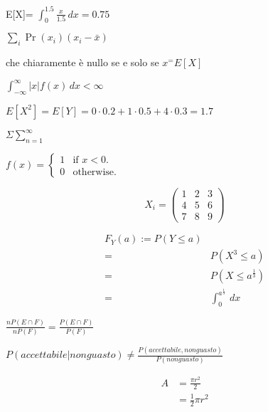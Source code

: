 \documentclass[]{article}
\begin{document}
    E[X]= $\int_{0}^{1.5} \frac{x}{1.5}\,dx = 0.75$
    
    $\sum_{i}^{} \Pr(x_i)(x_i - \bar{x}) $

    che chiaramente è nullo se e solo se $x^ = E[X]$

    $\int_ {-\infty }^{\infty} |x| f(x) \,dx < \infty$

    $E[X^2] = E[Y] = 0 \cdot 0.2 + 1 \cdot 0.5 + 4 \cdot 0.3 = 1.7$

    $\Sigma \sum_{n = 1}^{\infty} $
    
    \begin{math}
        f(x)=\left\{
            \begin{array}{ll}
                1 & \mbox{if $x<0$}.\\
                0 & \mbox{otherwise}.
            \end{array}
        \right.
    \end{math}

    $$
    X_i =
    \begin{pmatrix} 
        1 & 2 & 3 \\
        4 & 5 & 6 \\
        7 & 8 & 9
    \end{pmatrix}
    $$


    \begin{align*}
        F_Y(a) := P(Y \leq a) \\
        =&P(X^3 \leq a) \\
        =&P(X \leq a^\frac{1}{3}) \\
        =&\int_{0}^{a^\frac{1}{3}} \,dx
    \end{align*}


    \listoffigures
    \newpage

    $\frac{nP(E \cap F)}{nP(F)} = \frac{P(E \cap F)}{P(F)} $

    $P(accettabile | non guasto) \neq \frac{P(accettabile, non guasto)}{P(non guasto)}$

    \begin{equation} \label{eq1}
      \begin{split}
        A & = \frac{\pi r^2}{2} \\
        & = \frac{1}{2} \pi r^2
      \end{split}
    \end{equation}
\end{document}
